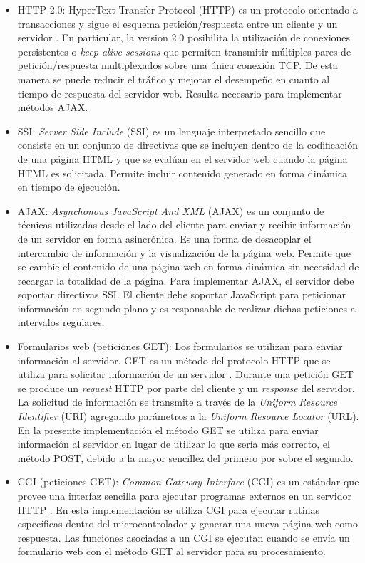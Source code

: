 \begin{itemize}
\item HTTP 2.0: HyperText Transfer Protocol (HTTP) es un protocolo orientado a transacciones y sigue el esquema petición/respuesta entre un cliente y un servidor \citep{rfc7540}. En particular, la version 2.0 posibilita la utilización de conexiones persistentes o \textit{keep-alive {sessions}} que permiten transmitir múltiples pares de petición/respuesta multiplexados sobre una única conexión TCP. De esta manera se puede reducir el tráfico y mejorar el desempeño en cuanto al tiempo de respuesta del servidor web. Resulta necesario para implementar métodos AJAX.

\item SSI: \textit{Server Side Include} (SSI) es un lenguaje interpretado sencillo que consiste en un conjunto de directivas que se incluyen dentro de la codificación de una página HTML y que se evalúan en el servidor web cuando la página HTML es solicitada.  Permite incluir contenido generado en forma dinámica en tiempo de ejecución.

\item AJAX: \textit{Asynchonous JavaScript And XML} (AJAX) es un conjunto de técnicas utilizadas desde el lado del cliente para enviar y recibir información de un servidor en forma asincrónica.  Es una forma de desacoplar el intercambio de información y la visualización de la página web.  Permite que se cambie el contenido de una página web en forma dinámica sin necesidad de recargar la totalidad de la página. Para implementar AJAX, el servidor debe soportar directivas SSI.  El cliente debe soportar JavaScript para peticionar información en segundo plano y es responsable de realizar dichas peticiones a intervalos regulares.

\item Formularios web (peticiones GET): Los formularios se utilizan para enviar información al servidor.  GET es un método del protocolo HTTP que se utiliza para solicitar información de un servidor \citep{rfc2616}. Durante una petición GET se produce un \textit{request} HTTP por parte del cliente y un \textit{response} del servidor. La solicitud de información se transmite a través de la \textit{Uniform Resource Identifier} (URI) agregando parámetros a la \textit{Uniform Resource Locator} (URL).  En la presente implementación el método GET se utiliza para enviar información al servidor en lugar de utilizar lo que sería más correcto, el método POST, debido a la mayor sencillez del primero por sobre el segundo.

\item CGI (peticiones GET): \textit{Common Gateway Interface} (CGI) es un estándar que provee una interfaz sencilla para ejecutar programas externos en un servidor HTTP \citep{rfc3875}. En esta implementación se utiliza CGI para ejecutar rutinas específicas dentro del microcontrolador y generar una nueva página web como respuesta.  Las funciones asociadas a un CGI se ejecutan cuando se envía un formulario web con el método GET al servidor para su procesamiento.
\end{itemize}

